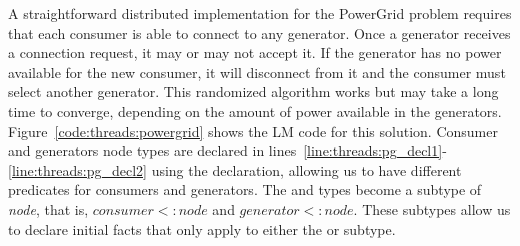 A straightforward distributed implementation for the PowerGrid problem requires
that each consumer is able to connect to any generator. Once a generator
receives a connection request, it may or may not accept it. If the generator has
no power available for the new consumer, it will disconnect from it and the
consumer must select another generator. This randomized algorithm works but may
take a long time to converge, depending on the amount of power available in the
generators. Figure~\ref{code:threads:powergrid} shows the LM code for this
solution. Consumer and generators node types are declared in
lines~\ref{line:threads:pg_decl1}-\ref{line:threads:pg_decl2} using the
 declaration, allowing us to have different predicates for consumers
and generators. The  and  types become a subtype
of \emph{node}, that is, $consumer <: node$ and $generator <: node$.  These
subtypes allow us to declare initial facts that only apply to either the
 or  subtype.

